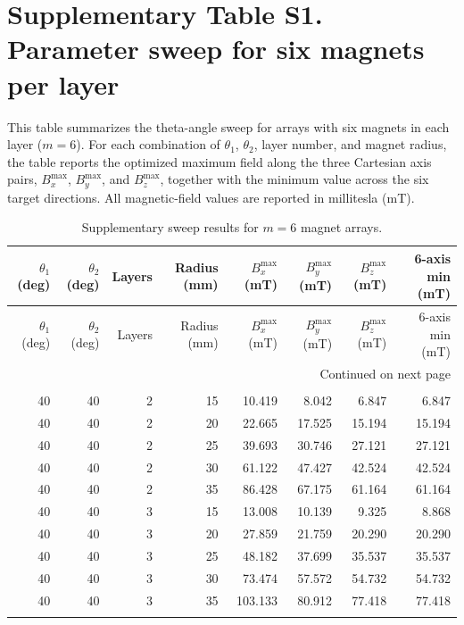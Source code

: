 \documentclass{article}
\begin{document}
\section*{Supplementary Table S1. Parameter sweep for six magnets per layer}
\noindent
This table summarizes the theta-angle sweep for arrays with six magnets in each layer
($m=6$). For each combination of $\theta_1$, $\theta_2$, layer number, and magnet
radius, the table reports the optimized maximum field along the three Cartesian
axis pairs, $B_x^{\max}$, $B_y^{\max}$, and $B_z^{\max}$, together with the
minimum value across the six target directions. All magnetic-field values are
reported in millitesla (mT).

\begin{longtable}{rrrrrrrr}
\caption{Supplementary sweep results for $m=6$ magnet arrays.}\\
\toprule
$\theta_1$ (deg) & $\theta_2$ (deg) & Layers & Radius (mm) & $B_x^{\max}$ (mT) & $B_y^{\max}$ (mT) & $B_z^{\max}$ (mT) & 6-axis min (mT) \\
\midrule
\endfirsthead
\toprule
$\theta_1$ (deg) & $\theta_2$ (deg) & Layers & Radius (mm) & $B_x^{\max}$ (mT) & $B_y^{\max}$ (mT) & $B_z^{\max}$ (mT) & 6-axis min (mT) \\
\midrule
\endhead
\midrule
\multicolumn{8}{r}{Continued on next page} \\
\endfoot
\bottomrule
\endlastfoot
\multicolumn{8}{l}{\textbf{$\theta_1=40^\circ$, $\theta_2=40^\circ$}} \\
40 & 40 & 2 & 15 & 10.419 & 8.042 & 6.847 & 6.847 \\
40 & 40 & 2 & 20 & 22.665 & 17.525 & 15.194 & 15.194 \\
40 & 40 & 2 & 25 & 39.693 & 30.746 & 27.121 & 27.121 \\
40 & 40 & 2 & 30 & 61.122 & 47.427 & 42.524 & 42.524 \\
40 & 40 & 2 & 35 & 86.428 & 67.175 & 61.164 & 61.164 \\
40 & 40 & 3 & 15 & 13.008 & 10.139 & 9.325 & 8.868 \\
40 & 40 & 3 & 20 & 27.859 & 21.759 & 20.290 & 20.290 \\
40 & 40 & 3 & 25 & 48.182 & 37.699 & 35.537 & 35.537 \\
40 & 40 & 3 & 30 & 73.474 & 57.572 & 54.732 & 54.732 \\
40 & 40 & 3 & 35 & 103.133 & 80.912 & 77.418 & 77.418 \\
\addlinespace
\multicolumn{8}{l}{\textbf{$\theta_1=40^\circ$, $\theta_2=45^\circ$}} \\

\end{longtable}
\end{document}
